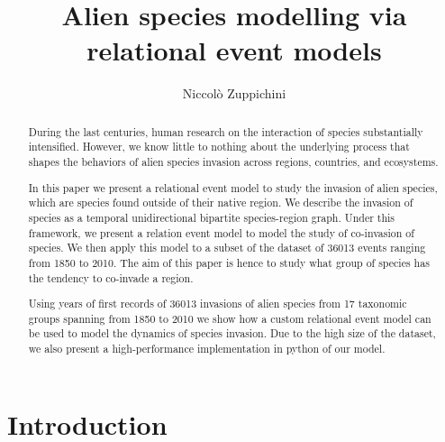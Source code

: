 \documentclass[mscthesis]{usiinfthesis}
\title{Alien species modelling via relational event models} %
\author{Niccol\`o Zuppichini} %
\begin{document}
\maketitle %
\frontmatter %

\begin{abstract}
\newcommand\numberevents{36013 } %

During the last centuries, human research on the interaction of species substantially intensified. However, we know little to nothing about the underlying process that shapes the behaviors of alien species invasion across regions, countries, and ecosystems.

In this paper we present a relational event model to study the invasion of alien species, which are species found outside of their native region. We describe the invasion of species as a temporal unidirectional bipartite species-region graph. Under this framework, we present a relation event model to model the study of co-invasion of species. We then apply this model to a subset of the dataset of \numberevents events ranging from 1850 to 2010. The aim of this paper is hence to study what group of species has the tendency to co-invade a region.

Using years of first records of \numberevents invasions of alien species from 17 taxonomic groups spanning from 1850 to 2010 we show how a custom relational event model can be used to model the dynamics of species invasion. Due to the high size of the dataset, we also present a high-performance implementation in python of our model.

\end{abstract}



\mainmatter

\chapter{Introduction}
\end{document}
